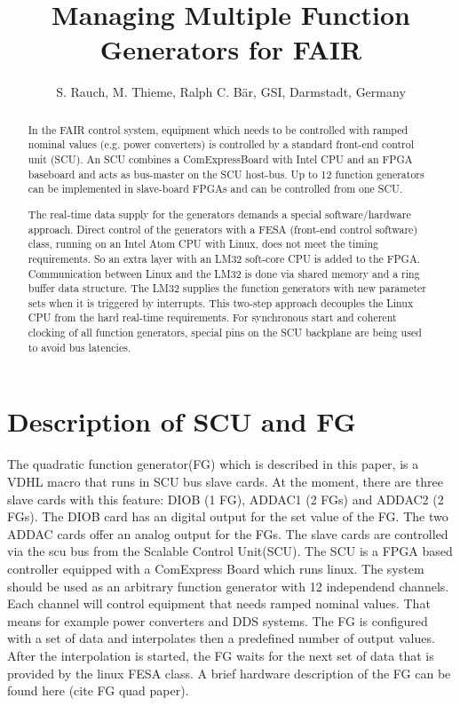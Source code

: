 \documentclass[a4paper,
              ]{jacow}
\begin{document}
\title{Managing Multiple Function Generators for FAIR}

\author{S. Rauch, M. Thieme, Ralph C. Bär, GSI,  Darmstadt, Germany}

\maketitle

%
\begin{abstract}
In the FAIR control system, equipment which needs to be controlled with ramped nominal values (e.g. power converters) is controlled by a standard front-end control unit (SCU). An SCU combines a ComExpressBoard with Intel CPU and an FPGA baseboard and acts as bus-master on the SCU host-bus. Up to 12 function generators can be implemented in slave-board FPGAs and can be controlled from one SCU.

The real-time data supply for the generators demands a special software/hardware approach. Direct control of the generators with a FESA (front-end control software) class, running on an Intel Atom CPU with Linux, does not meet the timing requirements. So an extra layer with an LM32 soft-core CPU is added to the FPGA. Communication between Linux and the LM32 is done via shared memory and a ring buffer data structure. The LM32 supplies the function generators with new parameter sets when it is triggered by interrupts. This two-step approach decouples the Linux CPU from the hard real-time requirements. For synchronous start and coherent clocking of all function generators, special pins on the SCU backplane are being used to avoid bus latencies.\end{abstract}


\section{Description of SCU and FG}
The quadratic function generator(FG) which is described in this paper, is a VDHL macro that runs in SCU bus slave cards. At the moment, there are three slave cards with this feature: DIOB (1 FG), ADDAC1 (2 FGs) and ADDAC2 (2 FGs). The DIOB card has an digital output for the set value of the FG. The two ADDAC cards offer an analog output for the FGs. The slave cards are
controlled via the scu bus from the Scalable Control Unit(SCU). The SCU is a FPGA based controller equipped with a ComExpress Board which runs linux.
The system should be used as an arbitrary function generator with 12 independend channels. Each channel will control equipment that needs ramped nominal values. That means for example  power converters and DDS systems.
The FG is configured with a set of data and interpolates then a predefined number of output values. After the interpolation is started, the FG waits for the next set of data that
is provided by the linux FESA class. A brief hardware description of the FG can be found here (cite FG quad paper).
\end{document}
